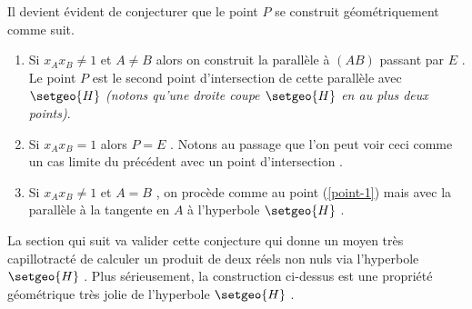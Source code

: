 \medskip

Il devient évident de conjecturer que le point $P$ se construit géométriquement comme suit.

\begin{enumerate}
	\item \label{point-1} Si $x_A x_B \neq 1$ et $A \neq B$ alors on construit la parallèle à $(AB)$ passant par $E$ . Le point $P$ est le second point d'intersection de cette parallèle avec $\setgeo{H}$  \emph{(notons qu'une droite coupe $\setgeo{H}$ en au plus deux points)}.

	\item Si $x_A x_B = 1$ alors $P = E$ . Notons au passage que l'on peut voir ceci comme un cas limite du précédent avec un point d'intersection .

	\item Si $x_A x_B \neq 1$ et $A = B$ , on procède comme au point (\ref{point-1}) mais avec la parallèle à la tangente en $A$ à l'hyperbole $\setgeo{H}$ .
\end{enumerate}


La section qui suit va valider cette conjecture qui donne un moyen très capillotracté de calculer un produit de deux réels non nuls via l'hyperbole $\setgeo{H}$ .
Plus sérieusement, la construction ci-dessus est une propriété géométrique très jolie de l'hyperbole $\setgeo{H}$ .
